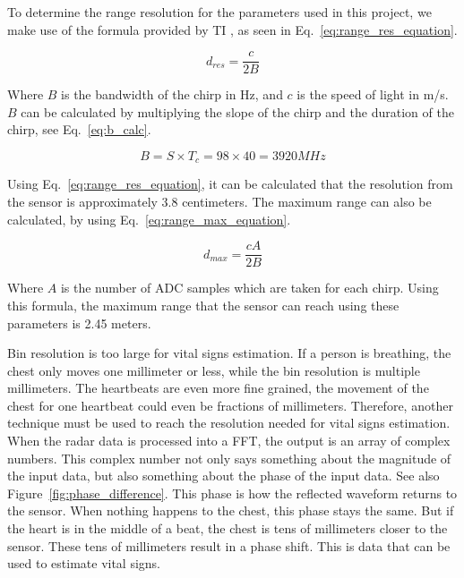 To determine the range resolution for the parameters used in this project, we make use of the formula provided by TI \cite{range_est_training_website}, as seen in Eq.~\ref{eq:range_res_equation}.

\begin{equation}
d_{res} = \frac{c}{2 B}
\label{eq:range_res_equation}
\end{equation}

Where $B$ is the bandwidth of the chirp in Hz, and $c$ is the speed of light in m/s. $B$ can be calculated by multiplying the slope of the chirp and the duration of the chirp, see Eq.~\ref{eq:b_calc}.

\begin{equation}
B = S \times T_c = 98 \times 40 = 3920 MHz
\label{eq:b_calc}
\end{equation}

Using Eq.~\ref{eq:range_res_equation}, it can be calculated that the resolution from the sensor is approximately 3.8 centimeters. The maximum range can also be calculated, by using Eq.~\ref{eq:range_max_equation}.

\begin{equation}
d_{max} = \frac{c A}{2 B}
\label{eq:range_max_equation}
\end{equation}

Where $A$ is the number of ADC samples which are taken for each chirp. Using this formula, the maximum range that the sensor can reach using these parameters is 2.45 meters. 

Bin resolution is too large for vital signs estimation. If a person is breathing, the chest only moves one millimeter or less, while the bin resolution is multiple millimeters. The heartbeats are even more fine grained, the movement of the chest for one heartbeat could even be fractions of millimeters. Therefore, another technique must be used to reach the resolution needed for vital signs estimation. When the radar data is processed into a FFT, the output is an array of complex numbers. This complex number not only says something about the magnitude of the input data, but also something about the phase of the input data. See also Figure~\ref{fig:phase_difference}. This phase is how the reflected waveform returns to the sensor. When nothing happens to the chest, this phase stays the same. But if the heart is in the middle of a beat, the chest is tens of millimeters closer to the sensor. These tens of millimeters result in a phase shift. This is data that can be used to estimate vital signs. 

